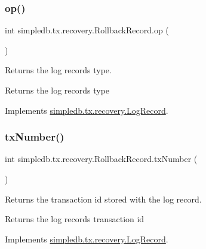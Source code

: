 \subsubsection{\texorpdfstring{op()}{op()}}
{\footnotesize\ttfamily int simpledb.\+tx.\+recovery.\+Rollback\+Record.\+op (\begin{DoxyParamCaption}{ }\end{DoxyParamCaption})\hspace{0.3cm}{\ttfamily [inline]}}

Returns the log record\textquotesingle{}s type. \begin{DoxyReturn}{Returns}
the log record\textquotesingle{}s type 
\end{DoxyReturn}


Implements \hyperlink{interfacesimpledb_1_1tx_1_1recovery_1_1LogRecord_aa97a8907de4709c2b3596e8c9709a26c}{simpledb.\+tx.\+recovery.\+Log\+Record}.

\mbox{\label{classsimpledb_1_1tx_1_1recovery_1_1RollbackRecord_a89c5de69f9f9653116e3335afb4f178b}} 
\subsubsection{\texorpdfstring{tx\+Number()}{txNumber()}}
{\footnotesize\ttfamily int simpledb.\+tx.\+recovery.\+Rollback\+Record.\+tx\+Number (\begin{DoxyParamCaption}{ }\end{DoxyParamCaption})\hspace{0.3cm}{\ttfamily [inline]}}

Returns the transaction id stored with the log record. \begin{DoxyReturn}{Returns}
the log record\textquotesingle{}s transaction id 
\end{DoxyReturn}


Implements \hyperlink{interfacesimpledb_1_1tx_1_1recovery_1_1LogRecord_a167f7406c18bf3367f1b83f6853870db}{simpledb.\+tx.\+recovery.\+Log\+Record}.

\mbox{\label{classsimpledb_1_1tx_1_1recovery_1_1RollbackRecord_ad21d99845cfc0eaafe7ffdb01f8dae70}} 
